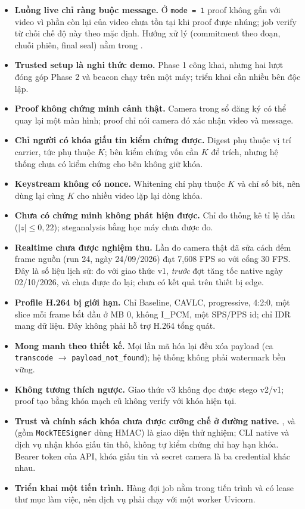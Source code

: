 \documentclass[10pt,a4paper]{article}
\begin{document}
\begin{itemize}
  \item \textbf{Luồng live chỉ ràng buộc message.} Ở \texttt{mode = 1} proof không gắn với video vì phần còn lại của video chưa tồn tại khi proof được nhúng; job verify từ chối chế độ này theo mặc định. Hướng xử lý (commitment theo đoạn, chuỗi phiên, final seal) nằm trong .
  \item \textbf{Trusted setup là nghi thức demo.} Phase 1 công khai, nhưng hai lượt đóng góp Phase 2 và beacon chạy trên một máy; triển khai cần nhiều bên độc lập.
  \item \textbf{Proof không chứng minh cảnh thật.} Camera trong sổ đăng ký có thể quay lại một màn hình; proof chỉ nói camera đó xác nhận video và message.
  \item \textbf{Chỉ người có khóa giấu tin kiểm chứng được.} Digest phụ thuộc vị trí carrier, tức phụ thuộc $K$; bên kiểm chứng vốn cần $K$ để trích, nhưng hệ thống chưa có kiểm chứng cho bên không giữ khóa.
  \item \textbf{Keystream không có nonce.} Whitening chỉ phụ thuộc $K$ và chỉ số bit, nên dùng lại cùng $K$ cho nhiều video lặp lại dòng khóa.
  \item \textbf{Chưa có chứng minh không phát hiện được.} Chỉ đo thống kê tỉ lệ dấu ($|z|\leq 0{,}22$); steganalysis bằng học máy chưa được đo.
  \item \textbf{Realtime chưa được nghiệm thu.} Lần đo camera thật đã sửa cách đếm frame nguồn (run 24, ngày 24/09/2026) đạt 7,608 FPS so với cổng 30 FPS. Đây là số liệu lịch sử: đo với giao thức v1, \emph{trước} đợt tăng tốc native ngày 02/10/2026, và chưa được đo lại; chưa có kết quả trên thiết bị edge.
  \item \textbf{Profile H.264 bị giới hạn.} Chỉ Baseline, CAVLC, progressive, 4:2:0, một slice mỗi frame bắt đầu ở MB 0, không I\_PCM, một SPS/PPS id; chỉ IDR mang dữ liệu. Đây không phải hỗ trợ H.264 tổng quát.
  \item \textbf{Mong manh theo thiết kế.} Mọi lần mã hóa lại đều xóa payload (ca \texttt{transcode} $\rightarrow$ \texttt{payload\_not\_found}); hệ thống không phải watermark bền vững.
  \item \textbf{Không tương thích ngược.} Giao thức v3 không đọc được stego v2/v1; proof tạo bằng khóa mạch cũ không verify với khóa hiện tại.
  \item \textbf{Trust và chính sách khóa chưa được cưỡng chế ở đường native.} ,  và  (gồm \texttt{MockTEESigner} dùng HMAC) là giao diện thử nghiệm; CLI native và dịch vụ nhận khóa giấu tin thô, không tự kiểm chứng chỉ hay hạn khóa. Bearer token của API, khóa giấu tin và secret camera là ba credential khác nhau.
  \item \textbf{Triển khai một tiến trình.} Hàng đợi job nằm trong tiến trình và có lease thư mục làm việc, nên dịch vụ phải chạy với một worker Uvicorn.
\end{itemize}
\end{document}
